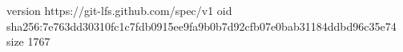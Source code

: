 version https://git-lfs.github.com/spec/v1
oid sha256:7e763dd30310fc1c7fdb0915ee9fa9b0b7d92cfb07e0bab31184ddbd96c35e74
size 1767
